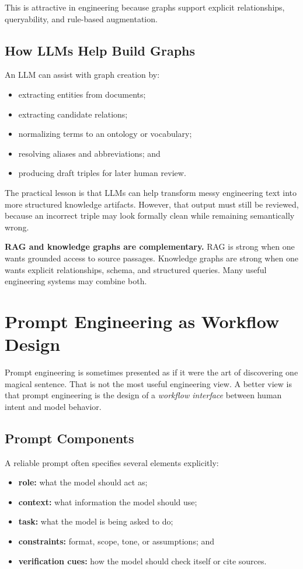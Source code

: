 \documentclass[12pt]{article}
\begin{document}
This is attractive in engineering because graphs support explicit relationships, queryability, and rule-based augmentation.

\subsection{How LLMs Help Build Graphs}

An LLM can assist with graph creation by:
\begin{itemize}
    \item extracting entities from documents;
    \item extracting candidate relations;
    \item normalizing terms to an ontology or vocabulary;
    \item resolving aliases and abbreviations; and
    \item producing draft triples for later human review.
\end{itemize}

The practical lesson is that LLMs can help transform messy engineering text into more structured knowledge artifacts. However, that output must still be reviewed, because an incorrect triple may look formally clean while remaining semantically wrong.

\begin{alert-box}
\textbf{RAG and knowledge graphs are complementary.} RAG is strong when one wants grounded access to source passages. Knowledge graphs are strong when one wants explicit relationships, schema, and structured queries. Many useful engineering systems may combine both.
\end{alert-box}

\section{Prompt Engineering as Workflow Design}

Prompt engineering is sometimes presented as if it were the art of discovering one magical sentence. That is not the most useful engineering view. A better view is that prompt engineering is the design of a \emph{workflow interface} between human intent and model behavior.

\subsection{Prompt Components}

A reliable prompt often specifies several elements explicitly:
\begin{itemize}
    \item \textbf{role:} what the model should act as;
    \item \textbf{context:} what information the model should use;
    \item \textbf{task:} what the model is being asked to do;
    \item \textbf{constraints:} format, scope, tone, or assumptions; and
    \item \textbf{verification cues:} how the model should check itself or cite sources.
\end{itemize}
\end{document}
